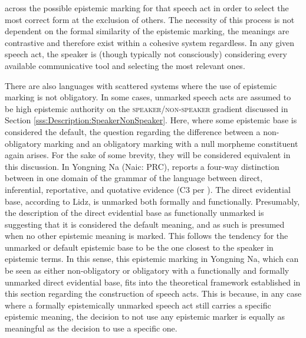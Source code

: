 across the possible epistemic marking for that speech act in order to select the most correct form at the exclusion of others. The necessity of this process is not dependent on the formal similarity of the epistemic marking, the meanings are contrastive and therefore exist within a cohesive system regardless. In any given speech act, the speaker is (though typically not consciously) considering every available communicative tool and selecting the most relevant ones.

There are also languages with scattered systems where the use of epistemic marking is not obligatory. In some cases, unmarked speech acts are assumed to be high epistemic authority on the \textsc{speaker/non-speaker} gradient discussed in Section \ref{sss:Description:SpeakerNonSpeaker}. Here, where some epistemic base is considered the default, the question regarding the difference between a non-obligatory marking and an obligatory marking with a null morpheme constituent again arises. For the sake of some brevity, they will be considered equivalent in this discussion. In Yongning Na (Naic: PRC),  reports a four-way distinction between in one domain of the grammar of the language between direct, inferential, reportative, and quotative evidence (C3 per ). The direct evidential base, according to Lidz, is unmarked both formally and functionally. Presumably, the description of the direct evidential base as functionally unmarked is suggesting that it is considered the default meaning, and as such is presumed when no other epistemic meaning is marked. This follows the tendency for the unmarked or default epistemic base to be the one closest to the speaker in epistemic terms. In this sense, this epistemic marking in Yongning Na, which can be seen as either non-obligatory or obligatory with a functionally and formally unmarked direct evidential base, fits into the theoretical framework established in this section regarding the construction of speech acts. This is because, in any case where a formally epistemically unmarked speech act still carries a specific epistemic meaning, the decision to not use any epistemic marker is equally as meaningful as the decision to use a specific one.

